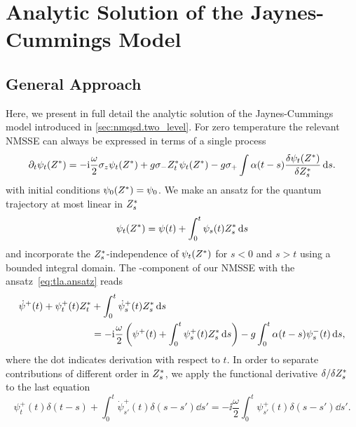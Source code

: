 \chapter{Analytic Solution of the Jaynes-Cummings Model}
\label{cha:tla}

\section{General Approach}
\label{sec:tla.general}

Here, we present in full detail the analytic solution of the Jaynes-Cummings model introduced in \autoref{sec:nmqsd.two_level}.
For zero temperature the relevant NMSSE can always be expressed in terms of a single process
\begin{equation}
  \partial_t \psitZ = -\ii\frac{\omega}{2}\sigma_z\psitZ + g \sigma_- \ZZ_t \psitZ - g\sigma_+ \int \alpha(t - s) \frac{\delta\psitZ}{\delta \ZZ_s} \dd s.
  \label{eq:tla.nmsse_twolevel}
\end{equation}
with initial conditions $\psi_0({Z}^*) = \psi_0$.
We make an ansatz for the quantum trajectory at most linear in ${Z}^*_s$
\begin{equation}
  \psitZ = \psi(t) + \int_0^t \psi_s(t) \ZZ_s \dd s
  \label{eq:tla.ansatz}
\end{equation}
and incorporate the ${Z}^*_s$-independence of $\psitZ$ for $s < 0$ and $s>t$ using a bounded integral domain.
The \quotes{+}-component of our NMSSE with the ansatz~\ref{eq:tla.ansatz} reads
\begin{align}
  \dot\psi^+(t) + \psi^+_t(t){Z}^*_t &+ \int_0^t \dot\psi^+_s(t) {Z}^*_s \, \mathrm{d} s \nonumber\\
  &= -\mathrm{i} \frac{\omega}{2} \left( \psi^+(t) + \int_0^t \psi^+_s(t){Z}^*_s \, \mathrm{d} s \right) - g \int_0^t \alpha(t-s) \psi^-_s(t) \, \mathrm{d} s,
  \label{eq:tla.psi_plus}
\end{align}
where the dot indicates derivation with respect to $t$.
In order to separate contributions of different order in ${Z}^*_s$, we apply the functional derivative $\delta/\delta{Z}^*_s$ to the last equation
\begin{equation}
  \psi^+_t(t) \delta(t - s) + \int_0^t \dot\psi^+_{s'}(t) \delta(s - s') \dd s' = -\ii \frac{\omega}{2} \int_0^t \psi^+_{s'}(t) \delta(s - s') \dd s'.
  \label{eq:tla.psi_plus_deriv}
\end{equation}
